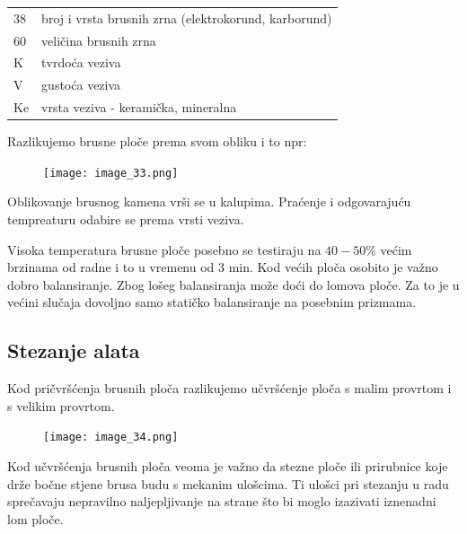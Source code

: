 \documentclass[a4paper,12pt]{article}
\numberwithin{figure}{section}
\begin{document}
\begin{table}[!h]
\centering
\begin{tabular}{ll}
38 & broj i vrsta brusnih zrna (elektrokorund, karborund) \\
60 & veličina brusnih zrna                                \\
K  & tvrdoća veziva                                       \\
V  & gustoća veziva                                       \\
Ke & vrsta veziva - keramička, mineralna                 
\end{tabular}
\end{table}
\FloatBarrier
Razlikujemo brusne ploče prema svom obliku i to npr:
\begin{figure}[!h]
\centering
\texttt{[image: image\_33.png]}
\end{figure}
\FloatBarrier
Oblikovanje brusnog kamena vrši se u kalupima. Praćenje i odgovarajuću tempreaturu odabire se prema vrsti veziva.\par
Visoka temperatura brusne ploče posebno se testiraju na $40 - 50\%$ većim brzinama od radne i to u vremenu od 3 min. Kod većih ploča osobito je važno dobro balansiranje. Zbog lošeg balansiranja može doći do lomova ploče. Za to je u većini slučaja dovoljno samo statičko balansiranje na posebnim prizmama.
\subsection{Stezanje alata}
Kod pričvršćenja brusnih ploča razlikujemo učvršćenje ploča s malim provrtom i s velikim provrtom.
\begin{figure}[!h]
\centering
\texttt{[image: image\_34.png]}
\end{figure}
\FloatBarrier
Kod učvršćenja brusnih ploča veoma je važno da stezne ploče ili prirubnice koje drže bočne stjene brusa budu s mekanim ulošcima. Ti ulošci pri stezanju u radu sprečavaju nepravilno naljepljivanje na strane što bi moglo izazivati iznenadni lom ploče.
\end{document}
